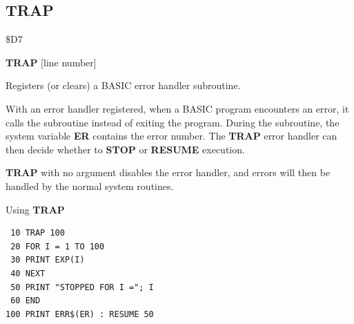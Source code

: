 \subsection{TRAP}
\begin{description}[leftmargin=2cm,style=nextline]
\item [Token:]    \$D7

\item [Format:]   {\bf TRAP} [line number]

\item [Usage:]    Registers (or clears) a BASIC error handler subroutine.

                  With an error handler registered, when a BASIC program encounters an error, it calls the subroutine instead of exiting the program. During the subroutine, the system variable {\bf ER} contains the error number. The {\bf TRAP} error handler can then decide whether to {\bf STOP} or {\bf RESUME} execution.

                  {\bf TRAP} with no argument disables the error handler, and errors will then be handled by the normal system routines.

\item [Example:]  Using {\bf TRAP}

\begin{tcolorbox}[colback=black,coltext=white]
\verbatimfont{\codefont}
\begin{verbatim}
 10 TRAP 100
 20 FOR I = 1 TO 100
 30 PRINT EXP(I)
 40 NEXT
 50 PRINT "STOPPED FOR I ="; I
 60 END
100 PRINT ERR$(ER) : RESUME 50
\end{verbatim}
\end{tcolorbox}
\end{description}


\newpage
